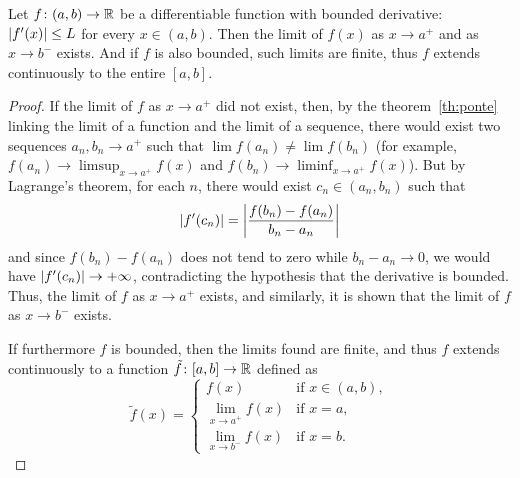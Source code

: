 \begin{exercise}
  \label{ex:estensione_continua_derivata_limitata}
Let $f\colon (a,b)\to {\mathbb R}$ be a differentiable function with bounded derivative:
${\left|f'(x)\right|} \le L$ for every $x\in (a,b)$.
Then the limit of $f(x)$ as $x\to a^+$ and as $x\to b^-$ exists.
And if $f$ is also bounded, such limits are finite, thus 
$f$ extends continuously to the entire $[a,b]$.
\end{exercise}
\begin{proof}
If the limit of $f$ as $x\to a^+$ did not exist, then,
by the theorem~\ref{th:ponte} linking the limit of a function 
and the limit of a sequence, there would exist two sequences $a_n, b_n \to a^+$
such that $\lim f(a_n) \neq \lim f(b_n)$
(for example, $f(a_n)\to \limsup_{x\to a^+} f(x)$ and
$f(b_n)\to \liminf_{x\to a^+} f(x)$).
But by Lagrange's theorem, for each $n$, there would exist $c_n \in (a_n, b_n)$
such that
\[
  {\left|f'(c_n)\right|} =
  {\left|\frac{f(b_n) - f(a_n)}{b_n - a_n}\right|}
\]
and since $f(b_n)-f(a_n)$ does not tend to zero while $b_n - a_n \to 0$,
we would have ${\left|f'(c_n)\right|} \to +\infty$,
contradicting the hypothesis that the derivative is bounded.
Thus, the limit of $f$ as $x\to a^+$ exists, and similarly, it is shown that the
limit
of $f$ as $x\to b^-$ exists.

If furthermore $f$ is bounded,
then the limits found are finite, and 
thus $f$ extends continuously to a function $\tilde f\colon [a,b]\to {\mathbb R}$ 
defined as
\[
  \tilde f(x) = \begin{cases}
    f(x) & \text{if }x\in (a,b),\\
    \displaystyle\lim_{x\to a^+} f(x) & \text{if } x=a,\\
    \displaystyle\lim_{x\to b^-} f(x) & \text{if } x=b.
  \end{cases}
\]
\end{proof}